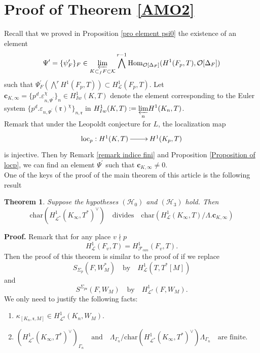 \documentclass[reqno]{amsart}
\newcounter{dummy} \numberwithin{dummy}{section}
\newtheorem{theo}[dummy]{Theorem }
\begin{document}
\section{Proof of Theorem \ref{AMO2}}
Recall that we proved in Proposition \ref{pro element psi0} the
existence of an element
\begin{equation*}
\Psi^{\prime}=\{\psi_{F}^{\prime}\}_{F}\in
\displaystyle{\varprojlim_{K\subset_{f}F\subset
\mathcal{K}}}\bigwedge^{r-1}\mathrm{Hom}_{\mathcal{O}[\Delta_{F}]}(H^{1}(F_{p},T),\mathcal{O}[\Delta_{F}])
\end{equation*}
such that $\Psi^{\prime}_{F}(\bigwedge^{r}H^{1}(F_{p},T))\subset
H^{1}_{\mathcal{L}}(F_{p},T)$. Let
$\mathbf{c}_{K,\infty}=\{p^{d}.\varepsilon_{n,\Psi^{\prime}}^{\chi}\}_{n}
\in H^{1}_{Iw}(K,T)$ denote the element corresponding to the Euler
system
$\{p^{d}.\varepsilon_{n,\Psi^{\prime}}(\mathfrak{r})^{\chi}\}_{n,\mathfrak{r}}$
 in $H^{1}_{Iw}(K,T):=\displaystyle{\varprojlim_{n}}H^{1}(K_{n},T)$.\\
Remark that under the Leopoldt conjecture for $L$,  the localization
map $$\xymatrix@=2pc{ \mathrm{loc}_{p} : H^{1}(K,T)\ar[r]&
H^{1}(K_{p},T)}$$ is injective. Then by Remark \ref{remark indice
fini} and Proposition \ref{Proposition of locp}, we can find an
element
$\Psi^{\prime}$ such that $\mathbf{c}_{K,\infty}\neq 0$.\\
 One of the keys of the proof of the
main theorem of this article is the following result
\begin{theo}\label{Theo modified condition and char}
Suppose
 the hypotheses $(\mathcal{H}_{0})$ and $(\mathcal{H}_{3})$ hold.
 Then
$$
\mathrm{char}(H^{1}_{\mathcal{L}^{\ast}}(K_{\infty},T^{\ast})^{\vee})\quad\mbox{divides}\quad
\mathrm{char}(H^{1}_{\mathcal{L}}(K_{\infty},T)/\Lambda.\mathbf{c}_{K,\infty})
$$
\end{theo}
\noindent \textbf{Proof.}
 Remark that for any place $v\nmid p$
$$
H^{1}_{\mathcal{L}}(F_{v},T)=H^{1}_{\mathcal{F}_{can}}(F_{v},T).
$$
  Then the proof of this theorem is
similar to the proof of \cite[Theorem 2.3.3]{Rubin00} if we replace
$$
S_{\Sigma_{p}}(F,W^{\ast}_{M})\quad\mbox{by}\quad
H^{1}_{\mathcal{L}}(T,T^{\ast}[M])
$$
and
$$
S^{\Sigma_{p\mathfrak{r}}}(F,W_{M})\quad \mbox{by}\quad
H^{1}_{\mathcal{L}^{r}}(F,W_{M}).
$$
We only need to justify the  following facts:
\begin{enumerate}[label=(\roman*)]
    \item $
\kappa_{[K_{n},\mathfrak{r},M]}\in
H^{1}_{\mathcal{L}^{\mathfrak{r}}}(K_{n},W_{M}).$
    \item $(H^{1}_{\mathcal{L}^{\ast}}(K_{\infty},T^{\ast})^{\vee})_{\Gamma_{n}}\quad
\mbox{and}\quad
\Lambda_{\Gamma_{n}}/\mathrm{char}(H^{1}_{\mathcal{L}^{\ast}}(K_{\infty},T^{\ast})^{\vee})\Lambda_{\Gamma_{n}}
\quad\mbox{are finite}$.
\end{enumerate}
\end{document}
